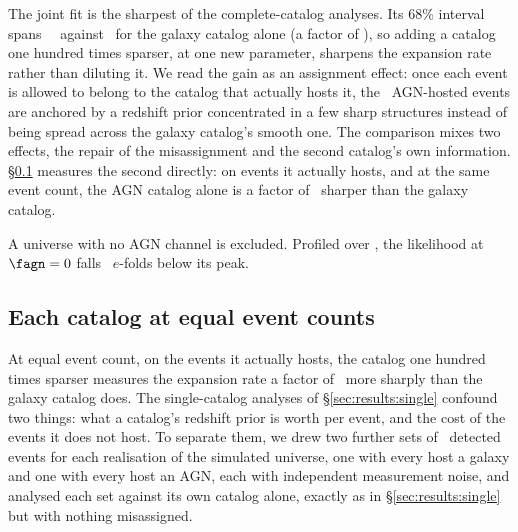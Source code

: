 The joint fit is the sharpest of the complete-catalog analyses.
Its 68\% interval spans \HzeroJointWidth~\kmsmpc\ against \HzeroGalWidth\ for
the galaxy catalog alone (a factor of \HzeroWidthRatio), so adding a
catalog one hundred times sparser, at one new parameter,
sharpens the expansion rate rather than diluting it. We read the gain as an
assignment effect: once each event is allowed to belong to the catalog that
actually hosts it, the \EvNhostAgn\ AGN-hosted events are anchored by a
redshift prior concentrated in a few sharp structures instead of being spread
across the galaxy catalog's smooth one. The comparison mixes two effects,
the repair of the misassignment and the second catalog's own information.
\S\ref{sec:results:pure} measures the second directly: on events it
actually hosts, and at the same event count, the AGN catalog alone is a
factor of \PureWidthRatio\ sharper than the galaxy catalog.

A universe with no AGN channel is excluded. Profiled over \Hz, the likelihood
at $\fagn = 0$ falls \FagnZeroDlnL\ $e$-folds below its peak.

\subsection{Each catalog at equal event counts}
\label{sec:results:pure}

At equal event count, on the events it actually hosts, the catalog one hundred
times sparser measures the expansion rate a factor of \PureWidthRatio\ more
sharply than the galaxy catalog does. The single-catalog analyses of
\S\ref{sec:results:single} confound two things: what a catalog's redshift
prior is worth per event, and the cost of the events it does not host. To
separate them, we drew two further sets of \PureNevents\ detected events for
each realisation of the simulated universe, one with every host a galaxy and
one with every host an AGN, each with independent measurement noise, and
analysed each set against its own catalog alone, exactly as in
\S\ref{sec:results:single} but with nothing misassigned.

